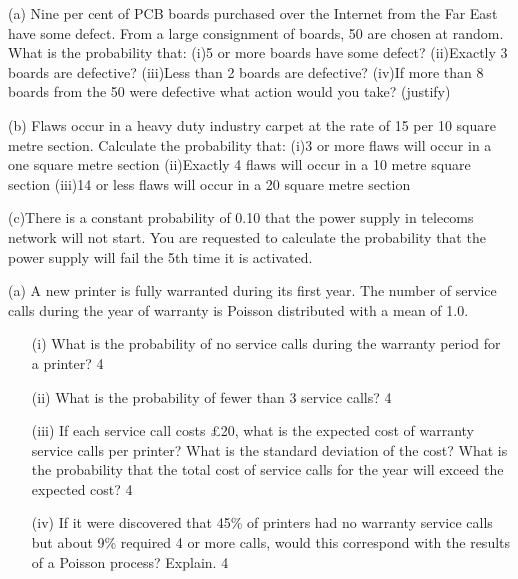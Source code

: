 
(a)  Nine per cent of PCB boards purchased over the Internet from the Far East have some defect.  From a large consignment of boards, 50 are chosen at random.  What is the probability that:
(i)5 or more boards have some defect?
(ii)Exactly 3 boards are defective?
(iii)Less than 2 boards are defective?
(iv)If more than 8 boards from the 50 were defective what action would you take? (justify)


(b) Flaws occur in a heavy duty industry carpet at the rate of 15 per 10 square metre section.  Calculate the probability that:
(i)3 or more flaws will occur in a one square metre section
(ii)Exactly 4 flaws will occur in a 10 metre square section
(iii)14 or less flaws will occur in a 20 square metre section

(c)There is a constant probability of 0.10 that the power supply in telecoms network will not start.  You are requested to calculate the probability that the power supply will fail the 5th time it is activated.%

(a) A new printer is fully warranted during its first year. The number of service calls  during the year of warranty is Poisson distributed with a mean of 1.0. 

\begin{itemize} 
	\item[(i)] What is the probability of no service calls during the warranty period for a printer?                                                                                                            4 
	
	\item[(ii)] What is the probability of fewer than 3 service calls? 4 
	
	\item[(iii)] If each service call costs £20, what is the expected cost of warranty service calls per  printer? What is the standard deviation of the cost? What is the probability that the  total cost of service calls for the year will exceed the expected cost? 4 
	
	
	\item[(iv)] If it were discovered that 45\% of printers had no warranty service calls but about 9\%   required 4 or more calls, would this correspond with the results of a Poisson process?  Explain. 4 
\end{itemize}

